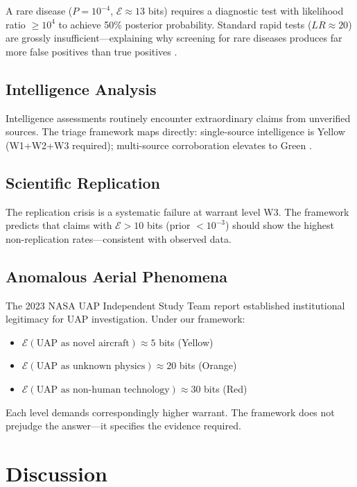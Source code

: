 \documentclass[12pt, a4paper]{article}
\theoremstyle{plain}
\theoremstyle{definition}
\begin{document}
A rare disease ($P = 10^{-4}$, $\mathcal{E} \approx 13$ bits) requires
a diagnostic test with likelihood ratio $\geq 10^4$ to achieve 50\%
posterior probability. Standard rapid tests ($LR \approx 20$) are
grossly insufficient---explaining why screening for rare diseases
produces far more false positives than true positives \citep{Gigerenzer2002}.

\subsection{Intelligence Analysis}

Intelligence assessments routinely encounter extraordinary claims from
unverified sources. The triage framework maps directly: single-source
intelligence is Yellow (W1+W2+W3 required); multi-source corroboration
elevates to Green \citep{Heuer1999}.

\subsection{Scientific Replication}

The replication crisis \citep{OpenScienceCollab2015} is a systematic
failure at warrant level W3. The framework predicts that claims with
$\mathcal{E} > 10$ bits (prior $< 10^{-3}$) should show the highest
non-replication rates---consistent with observed data.

\subsection{Anomalous Aerial Phenomena}

The 2023 NASA UAP Independent Study Team report \citep{NASA2023}
established institutional legitimacy for UAP investigation. Under our
framework:
\begin{itemize}
  \item $\mathcal{E}(\text{UAP as novel aircraft}) \approx 5$ bits
    (Yellow)
  \item $\mathcal{E}(\text{UAP as unknown physics}) \approx 20$ bits
    (Orange)
  \item $\mathcal{E}(\text{UAP as non-human technology}) \approx 30$
    bits (Red)
\end{itemize}

Each level demands correspondingly higher warrant. The framework does
not prejudge the answer---it specifies the evidence required.

\section{Discussion}\label{sec:discussion}
\end{document}
